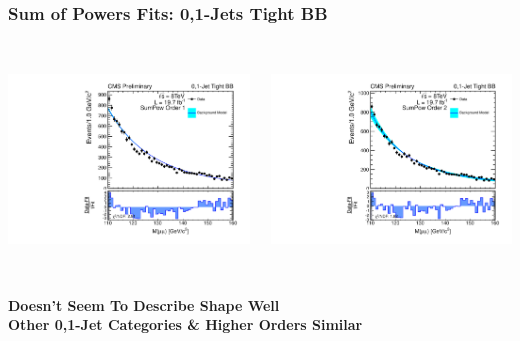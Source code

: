 \documentclass{beamer}
\begin{document}
\begin{frame}
\frametitle{Sum of Powers Fits: 0,1-Jets Tight BB}
\begin{columns}[c]
 \column{60mm}
    \begin{center}
      \includegraphics[height=55mm]{2013-10-04SystematicBiasStudy1/order_Shape_Jets01PassPtG10BB_SumPow1}
    \end{center}
 \column{60mm}
    \begin{center}
      \includegraphics[height=55mm]{2013-10-04SystematicBiasStudy1/order_Shape_Jets01PassPtG10BB_SumPow2}
    \end{center}
\end{columns}
\begin{center}
\bf
Doesn't Seem To Describe Shape Well
\\
Other 0,1-Jet Categories \& Higher Orders Similar
\end{center}
\end{frame}
\end{document}
